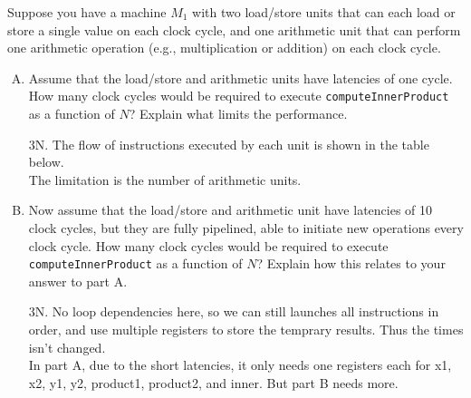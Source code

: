 \documentclass[11pt]{article}
\newenvironment{choice}{\begin{enumerate}[A.]}{\end{enumerate}}
\newenvironment{answer}{\begin{minipage}[c][1.5in]{\textwidth}}{\end{minipage}}
\begin{document}
Suppose you have a machine $M_1$ with two load/store units
  that can each load or store a single value on each clock cycle, and
  one arithmetic unit that can perform one arithmetic operation
  (e.g., multiplication or addition) on each clock cycle.


\begin{choice}
\item  
Assume that the load/store and arithmetic units have latencies of one cycle.
How many clock cycles would be required to
execute \texttt{computeInnerProduct} as a function of $N$?    Explain what limits the performance.

\begin{answer}

3N. The flow of instructions executed by each unit is shown in the table below. \\
The limitation is the number of arithmetic units. 

\end{answer}
\item 
Now assume that the load/store and arithmetic unit have
latencies of 10 clock cycles, but they are fully pipelined, able to
initiate new operations every clock cycle.  
How many clock cycles would be required to
execute \texttt{computeInnerProduct} as a function of $N$?    Explain how this relates to your answer to part A.

\begin{answer}
3N. No loop dependencies here, so we can still launches all instructions in order, and use 
multiple registers to store the temprary results. Thus the times isn't changed. \\
In part A, due to the short latencies, it only needs one registers each for x1, x2, y1, y2, product1, product2, and inner. But part B needs more. 

\end{answer}
\end{choice}
\end{document}
